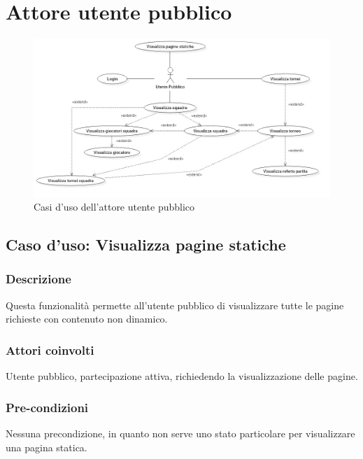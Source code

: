
\clearpage

\section{Attore utente pubblico}
%
%
\begin{figure}[h]
	\centering
	\includegraphics[width=1\textwidth]
	{immagini/uc-utente-pubblico}
	
	\caption{Casi d'uso dell'attore utente pubblico}
\end{figure}


%
%
\subsection{Caso d'uso: Visualizza pagine statiche}

	\subsubsection*{Descrizione}
	Questa funzionalità permette all'utente pubblico di visualizzare tutte le pagine richieste con contenuto non dinamico.
	
	\subsubsection*{Attori coinvolti}
	Utente pubblico, partecipazione attiva, richiedendo la visualizzazione delle pagine.
	
	\subsubsection*{Pre-condizioni}
	Nessuna precondizione, in quanto non serve uno stato particolare per visualizzare una pagina statica.
	
